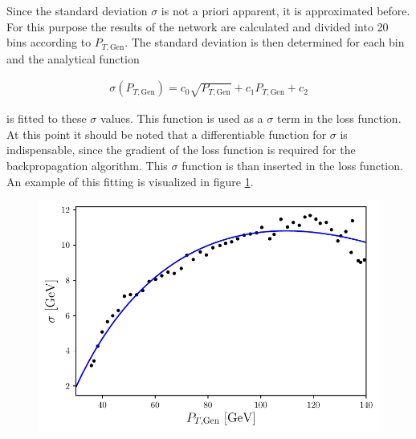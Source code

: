 \documentclass[12pt, a4paper]{thesis}
\begin{document}

Since the standard deviation \(\sigma\) is not a priori apparent, it
is approximated before. For this purpose the results of the network
are calculated and divided into 20 bins according to \(P_{T,
  \text{Gen}}\). The standard deviation is then determined for each
bin and the analytical function

\begin{align}
\sigma(P_{T, \text{Gen}})= c_0 \sqrt{P_{T, \text{Gen}}}+c_1 P_{T, \text{Gen}} + c_2 \label{fitfunction}
\end{align}

is fitted to these \(\sigma\) values. This function is used as a
\(\sigma\) term in the loss function. At this point it should be noted
that a differentiable function for \(\sigma\) is indispensable, since
the gradient of the loss function is required for the backpropagation
algorithm. This $\sigma$ function is than inserted in the loss
function.  An example of this fitting is visualized in figure
\ref{sigma_fit}.

\begin{figure}[hbtp]
  \centering
  \includegraphics[width=.9\linewidth]{../images/sigma_fit.pdf}
  \caption{}
  \label{sigma_fit}
\end{figure}
\end{document}
